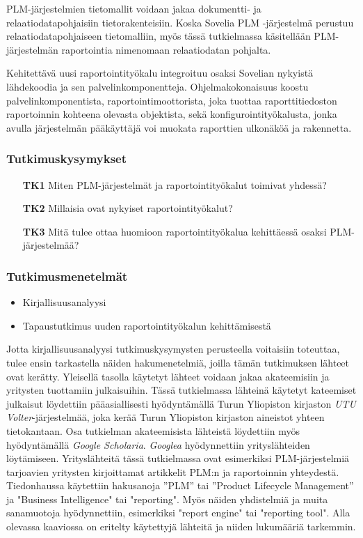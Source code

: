 PLM-järjestelmien tietomallit voidaan jakaa dokumentti- ja relaatiodatapohjaisiin tietorakenteisiin. \cite{david_what_2016} Koska Sovelia PLM -järjestelmä perustuu relaatiodatapohjaiseen tietomalliin, myös tässä tutkielmassa käsitellään PLM-järjestelmän raportointia nimenomaan relaatiodatan pohjalta.

Kehitettävä uusi raportointityökalu integroituu osaksi Sovelian nykyistä lähdekoodia ja sen palvelinkomponentteja. Ohjelmakokonaisuus koostu palvelinkomponentista, raportointimoottorista, joka tuottaa raporttitiedoston raportoinnin kohteena olevasta objektista, sekä konfigurointityökalusta, jonka avulla järjestelmän pääkäyttäjä voi muokata raporttien ulkonäköä ja rakennetta.

\subsubsection{Tutkimuskysymykset}
\begin{itemize}
\item[\textbf{TK1}] Miten PLM-järjestelmät ja raportointityökalut toimivat yhdessä?
\item[\textbf{TK2}] Millaisia ovat nykyiset raportointityökalut?
\item[\textbf{TK3}] Mitä tulee ottaa huomioon raportointityökalua kehittäessä osaksi PLM-järjestelmää?
\end{itemize}

\subsubsection{Tutkimusmenetelmät}
\begin{itemize}
\item Kirjallisuusanalyysi
\item Tapaustutkimus uuden raportointityökalun kehittämisestä
\end{itemize}

Jotta kirjallisuusanalyysi tutkimuskysymysten perusteella voitaisiin toteuttaa, tulee ensin tarkastella näiden hakumenetelmiä, joilla tämän tutkimuksen lähteet ovat kerätty. Yleisellä tasolla käytetyt lähteet voidaan jakaa akateemisiin ja yritysten tuottamiin julkaisuihin. Tässä tutkielmassa lähteinä käytetyt kateemiset julkaisut löydettiin pääasiallisesti hyödyntämällä Turun Yliopiston kirjaston \textit{UTU Volter}-järjestelmää, joka kerää Turun Yliopiston kirjaston aineistot yhteen tietokantaan. Osa tutkielman akateemisista lähteistä löydettiin myös hyödyntämällä \textit{Google Scholaria}. \textit{Googlea} hyödynnettiin yrityslähteiden löytämiseen. Yrityslähteitä tässä tutkielmassa ovat esimerkiksi PLM-järjestelmiä tarjoavien yritysten kirjoittamat artikkelit PLM:n ja raportoinnin yhteydestä. Tiedonhaussa käytettiin hakusanoja ”PLM” tai ”Product Lifecycle Management” ja "Business Intelligence" tai "reporting". Myös näiden yhdistelmiä ja muita sanamuotoja hyödynnettiin, esimerkiksi "report engine" tai "reporting tool". Alla olevassa kaaviossa on eritelty käytettyjä lähteitä ja niiden lukumääriä tarkemmin.

